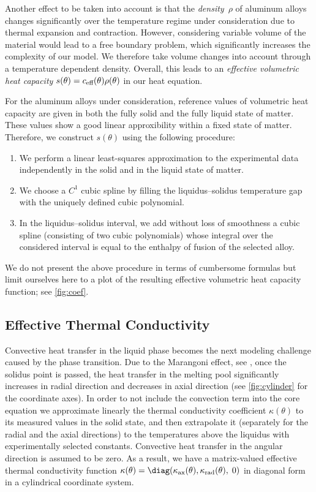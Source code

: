 Another effect to be taken into account is that the \emph{density}~$\rho$ of aluminum alloys changes significantly over the temperature regime under consideration due to thermal expansion and contraction.
However, considering variable volume of the material would lead to a free boundary problem, which significantly increases the complexity of our model.
We therefore take volume changes into account through a temperature dependent density.
Overall, this leads to an \emph{effective volumetric heat capacity} $s(\theta) = c_\textup{eff}(\theta) \rho(\theta)$ in our heat equation.

For the aluminum alloys under consideration, reference values of volumetric heat capacity are given in both the fully solid and the fully liquid state of matter. 
These values show a good linear approxibility within a fixed state of matter. 
Therefore, we construct $s(\theta)$ using the following procedure:
\begin{enumerate}
	\item 
		We perform a linear least-squares approximation to the experimental data independently in the solid and in the liquid state of matter.
	\item 
		We choose a $C^1$ cubic spline by filling the liquidus--solidus temperature gap with the uniquely defined cubic polynomial.
	\item 
		In the liquidus--solidus interval, we add without loss of smoothness a cubic spline (consisting of two cubic polynomials) whose integral over the considered interval is equal to the enthalpy of fusion of the selected alloy.
\end{enumerate}

We do not present the above procedure in terms of cumbersome formulas but limit ourselves here to a plot of the resulting effective volumetric heat capacity function; see \cref{fig:coef}.


\subsection{Effective Thermal Conductivity}
\label{subsec:conductivity}

Convective heat transfer in the liquid phase becomes the next modeling challenge caused by the phase transition. 
Due to the Marangoni effect, see \cite{MillsKeeneBrooksShirali:1998:1,Saldi:2012:1}, once the solidus point is passed, the heat transfer in the melting pool significantly increases in radial direction and decreases in axial direction (see \cref{fig:cylinder} for the coordinate axes).
In order to not include the convection term into the core equation we approximate linearly the thermal conductivity coefficient $\kappa(\theta)$ to its measured values in the solid state, and then extrapolate it (separately for the radial and the axial directions) to the temperatures above the liquidus with experimentally selected constants. 
Convective heat transfer in the angular direction is assumed to be zero.
As a result, we have a matrix-valued effective thermal conductivity function $\kappa(\theta) = \diag(\kappa_\textup{ax}(\theta), \kappa_\textup{rad}(\theta),\; 0)$ in diagonal form in a cylindrical coordinate system.

